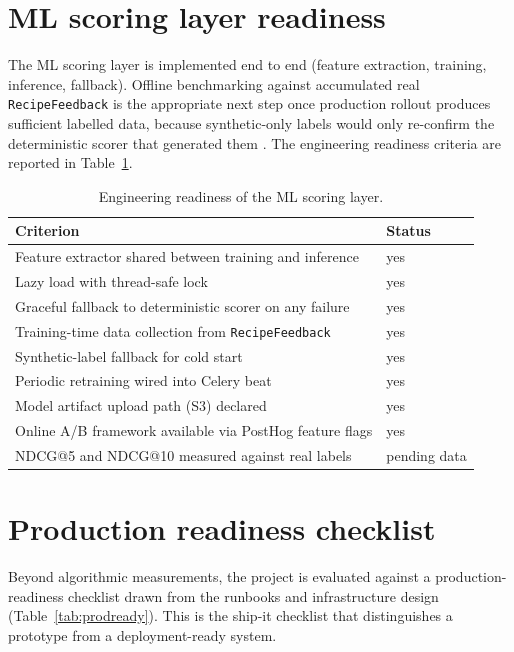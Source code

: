 \section{ML scoring layer readiness}

The ML scoring layer is implemented end to end (feature extraction, training, inference, fallback). Offline benchmarking against accumulated real \texttt{RecipeFeedback} is the appropriate next step once production rollout produces sufficient labelled data, because synthetic-only labels would only re-confirm the deterministic scorer that generated them \cite{sculley2015}. The engineering readiness criteria are reported in Table~\ref{tab:ml-ready}.

\begin{table}[H]
\centering
\small
\caption{Engineering readiness of the ML scoring layer.}
\label{tab:ml-ready}
\begin{tabularx}{\textwidth}{|X|p{2.8cm}|}
\hline
Criterion & Status \\
\hline
Feature extractor shared between training and inference & yes \\
Lazy load with thread-safe lock & yes \\
Graceful fallback to deterministic scorer on any failure & yes \\
Training-time data collection from \texttt{RecipeFeedback} & yes \\
Synthetic-label fallback for cold start & yes \\
Periodic retraining wired into Celery beat & yes \\
Model artifact upload path (S3) declared & yes \\
Online A/B framework available via PostHog feature flags & yes \\
NDCG@5 and NDCG@10 measured against real labels & pending data \\
\hline
\end{tabularx}
\end{table}

\section{Production readiness checklist}

Beyond algorithmic measurements, the project is evaluated against a production-readiness checklist drawn from the runbooks and infrastructure design (Table~\ref{tab:prodready}). This is the ship-it checklist that distinguishes a prototype from a deployment-ready system.

